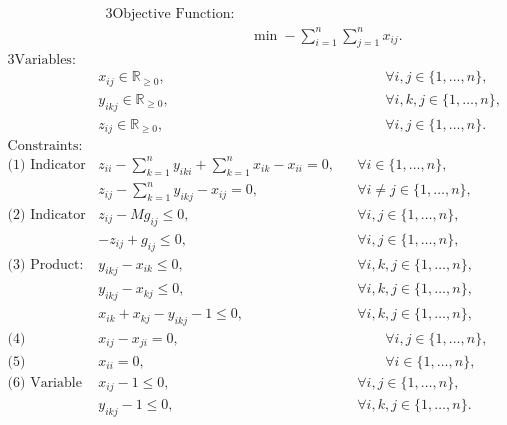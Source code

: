
\begin{alignat}{3}
\text{Objective Function: } & \nonumber \\
& \min - \sum_{i=1}^{n} \sum_{j=1}^{n} x_{ij}. \label{eq::primal_max_obj_function}
\end{alignat}
\begin{alignat}{3}
\text{Variables: } & \nonumber \\ 
& x_{ij} \in \mathbb{R}_{\geq 0}, 
&&\qquad \forall i,j \in \{1, \dots, n\}, \label{eq::canonical_LP_x_variable} \\
& y_{ikj} \in \mathbb{R}_{\geq 0}, 
&&\qquad \forall i,k,j \in \{1, \dots, n\}, \label{eq::canonical_LP_y_variable} \\
& z_{ij} \in \mathbb{R}_{\geq 0}, 
&&\qquad \forall i,j \in \{1, \dots, n\} \label{eq::canonical_LP_z_variable}. \\
\text{Constraints: } & \nonumber \\
\text{(1) Indicator argument: } 
& z_{ii} - \sum_{k = 1}^{n}y_{iki} + \sum_{k = 1}^{n} x_{ik} - x_{ii} = 0, 
&& \forall i \in \{1, \dots, n\} , \label{eq::canonical_LP_fund_matrix} \\
& z_{ij} - \sum_{k = 1}^{n}y_{ikj} - x_{ij} = 0, 
&& \forall i \neq j \in \{1, \dots, n\} , \label{eq::canonical_LP_indicator_arg} \\
\text{(2) Indicator function: } 
& z_{ij} - M g_{ij} \leq 0, 
&& \forall i, j \in \{1, \dots, n\}, \label{eq::canonical_LP_indicator_upper} \\
& - z_{ij} + g_{ij} \leq 0, 
&& \forall i, j \in \{1, \dots, n\}, \label{eq::canonical_LP_indicator_lower}\\
\text{(3) Product: } 
& y_{ikj} - x_{ik} \leq 0, 
&& \forall i, k, j \in \{1, \dots, n\}, \label{eq::canonical_LP_product_upper_first} \\
& y_{ikj} - x_{kj} \leq 0, 
&& \forall i, k, j \in \{1, \dots, n\}, \label{eq::canonical_LP_product_upper_second} \\
&  x_{ik} + x_{kj} - y_{ikj} - 1 \leq 0, 
&& \forall i, k, j \in \{1, \dots, n\}, \label{eq::canonical_LP_product_lower} \\
\text{(4) Symmetry: } 
& x_{ij} - x_{ji} = 0, 
&&\qquad \forall i,j \in \{1, \dots, n\}, \label{eq::canonical_LP_symmetry_x} \\
\text{(5) Diagonal: } 
& x_{ii} = 0, 
&&\qquad \forall i \in \{1, \dots, n\}, \label{eq::canonical_LP_diagonal_x} \\
\text{(6) Variable Bound: } 
& x_{ij} - 1 \leq 0,
&& \forall i, j \in \{1, \dots, n\}, \label{eq::canonical_LP_x_upper_bound} \\
& y_{ikj} - 1 \leq 0,
&& \forall i,k, j \in \{1, \dots, n\} \label{eq::canonical_LP_y_upper_bound}.
\end{alignat} \label{eq::canonical_linear_program}